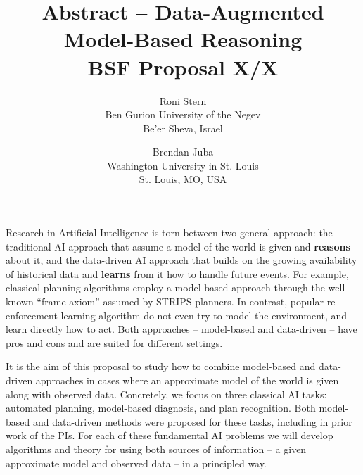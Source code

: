 \documentclass[12pt]{article}
\begin{document}
\title{Abstract -- Data-Augmented Model-Based Reasoning \\ BSF Proposal X/X}
\author{Roni Stern \\
Ben Gurion University of the Negev \\
Be'er Sheva, Israel
\and Brendan Juba \\
Washington University in St. Louis \\
St. Louis, MO, USA
}
\date{}
\maketitle

Research in Artificial Intelligence is torn between two general approach: the traditional AI approach that assume a model of the world is given and {\bf reasons} about it, and the data-driven AI approach that builds on the growing availability of historical data and {\bf learns} from it how to handle future events. For example, classical planning algorithms 
employ a model-based approach through the well-known ``frame axiom'' assumed by STRIPS planners. In contrast, popular re-enforcement learning algorithm do not even try to model the environment, and learn directly how to act. Both approaches -- model-based and data-driven -- have pros and cons and are suited for different settings. 





It is the aim of this proposal to study how to combine model-based and data-driven approaches in cases where an approximate model of the world is given along with observed data. Concretely, we focus on three classical AI tasks: automated planning, model-based diagnosis, and plan recognition. Both model-based and data-driven methods were proposed for these tasks, including in prior work of the PIs. 
For each of these fundamental AI problems we will develop algorithms and theory for using both sources of information --  a given approximate model and observed data -- in a principled way. 
\end{document}
